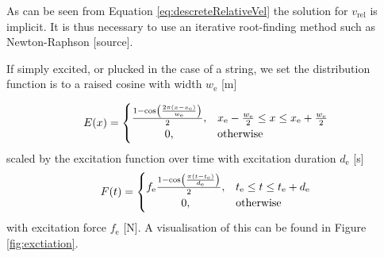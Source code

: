 \documentclass{article}
\begin{document}
As can be seen from Equation \eqref{eq:descreteRelativeVel} the solution for $v_\text{rel}$ is implicit. It is thus necessary to use an iterative root-finding method such as Newton-Raphson [source].

If simply excited, or plucked in the case of a string, we set the distribution function is to a raised cosine with width $w_\text{e}$ [m]

\begin{equation} \label{eq:distribution}
    E(x) = 
    \begin{cases}
        \hfil \frac{1 - \cos(\frac{2 \pi (x - x_\text{e})}{w_\text{e}})}{2}, & x_\text{e} -  \frac{w_\text{e}}{2} \leq x \leq x_\text{e} + \frac{w_\text{e}}{2} \\
        \hfil 0, &\text{otherwise}
    \end{cases}
\end{equation}
scaled by the excitation function over time with excitation duration $d_\text{e}$ [s]
\begin{equation}\label{eq:excitation}
    F(t) = 
    \begin{cases}
        f_\text{e}\frac{1 - \cos(\frac{\pi (t - t_\text{e})}{d_\text{e}})}{2}, & t_\text{e} \leq t \leq t_\text{e}+d_\text{e}\\
        \hfil 0, &\text{otherwise}
    \end{cases}
\end{equation}
with excitation force $f_\text{e}$ [N]. 
A visualisation of this can be found in Figure \ref{fig:exctiation}.



\end{document}
